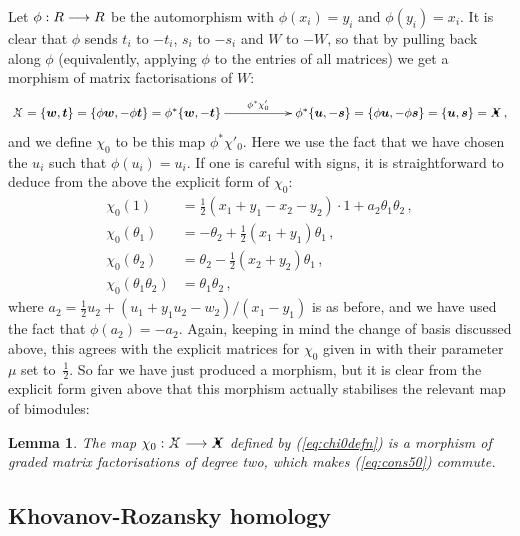 \documentclass{compositio}
\newtheorem{lemma}[theorem]{Lemma}
\theoremstyle{definition}
\numberwithin{equation}{section}
\begin{document}
Let $\phi: R \longrightarrow R$ be the automorphism with $\phi(x_i) = y_i$ and $\phi(y_i) = x_i$. It is clear that $\phi$ sends $t_i$ to $-t_i$, $s_i$ to $-s_i$ and $W$ to $-W$, so that by pulling back along $\phi$ (equivalently, applying $\phi$ to the entries of all matrices) we get a morphism of matrix factorisations of $W$: 
\[
\xymatrix{
\Xcirc = \{ \bs{w}, \bs{t} \} = \{ \phi\bs{w}, -\phi \bs{t} \} = \phi^*\{ \bs{w}, -\bs{t} \} \ar[rr]^-{\phi^* \chi'_0} & & \phi^*\{ \bs{u}, -\bs{s} \} = \{ \phi \bs{u}, -\phi \bs{s} \} = \{ \bs{u}, \bs{s} \} = \Xbul \, ,
}
\]
and we define $\chi_0$ to be this map $\phi^* \chi'_0$. Here we use the fact that we have chosen the $u_i$ such that $\phi(u_i) = u_i$. If one is careful with signs, it is straightforward to deduce from the above the explicit form of $\chi_0$:
\begin{align}
\chi_0(1) &= \frac{1}{2}(x_1 + y_1 - x_2 - y_2) \cdot 1 + a_2 \theta_1 \theta_2 \, ,\nonumber \\
\chi_0(\theta_1) &= -\theta_2 + \frac{1}{2}(x_1 + y_1) \theta_1\, ,\nonumber \\
\chi_0(\theta_2) &= \theta_2 - \frac{1}{2}(x_2 + y_2)\theta_1\, , \nonumber \\
\chi_0(\theta_1\theta_2) &= \theta_1\theta_2\,, \label{eq:chi0defn}
\end{align}
where $a_2 = \frac{1}{2}u_2 + (u_1 + y_1 u_2 - w_2)/(x_1-y_1)$ is as before, and we have used the fact that $\phi(a_2) = -a_2$. Again, keeping in mind the change of basis discussed above, this agrees with the explicit matrices for $\chi_0$ given in \cite[p.50]{kr0401268} with their parameter~$\mu$ set to~$\frac{1}{2}$. So far we have just produced a morphism, but it is clear from the explicit form given above that this morphism actually stabilises the relevant map of bimodules:

\begin{lemma} The map $\chi_0: \Xcirc \lto \Xbul$ defined by (\ref{eq:chi0defn}) is a morphism of graded matrix factorisations of degree two, which makes (\ref{eq:cons50}) commute.
\end{lemma}

\subsection{Khovanov-Rozansky homology}
\end{document}
